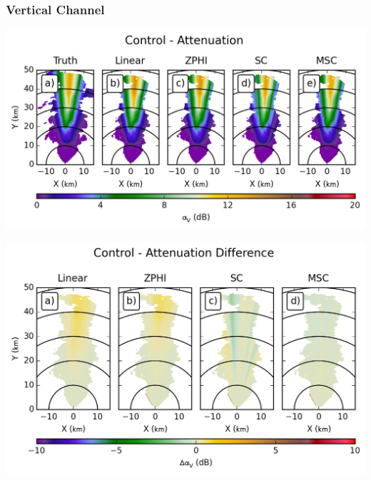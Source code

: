 \documentclass[red]{beamer}
\begin{document}
\subsubsection{Vertical Channel}
\begin{frame}
    \begin{center}
        \includegraphics[scale=0.7]{figures/spatial/C_Control_Attenuation_V}
    \end{center}
\end{frame}

\begin{frame}
    \begin{center}
        \includegraphics[scale=0.7]{figures/spatial/C_Control_Attenuation_Difference_V}
    \end{center}
\end{frame}
\end{document}
